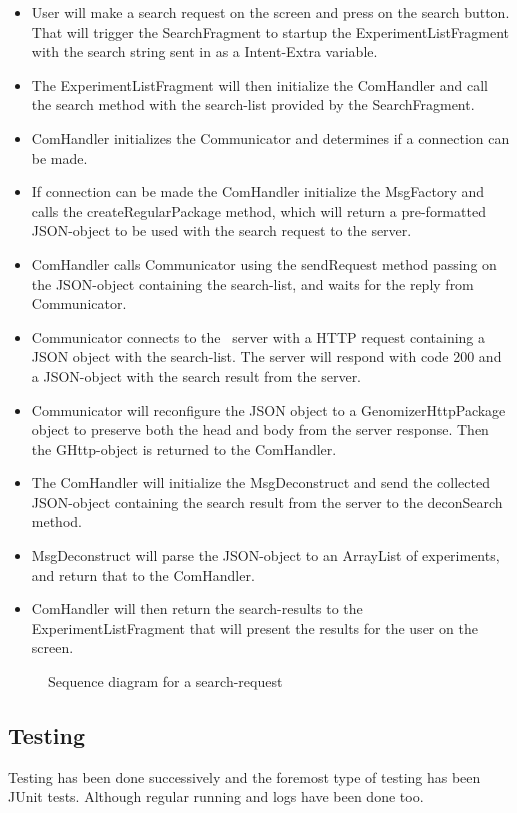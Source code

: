 	\begin{itemize}
		\item
			User will make a search request on the screen and press on the search button. That will trigger the SearchFragment to startup the ExperimentListFragment with the search string sent in as a Intent-Extra variable.
		\item
			The ExperimentListFragment will then initialize the ComHandler and call the search method with the search-list provided by the SearchFragment.
		\item
			ComHandler initializes the Communicator and determines if a connection can be made.
		\item
			If connection can be made the ComHandler initialize the MsgFactory and calls the createRegularPackage method, which will return a pre-formatted JSON-object to be used with the search request to the server.
		\item
			ComHandler calls Communicator using the sendRequest method passing on the JSON-object containing the search-list, and waits for the reply from Communicator.
		\item
			Communicator connects to the \appName\ server with a HTTP request containing a JSON object with the search-list. The server will respond with code 200 and a JSON-object with the search result from the server.
		\item
			Communicator will reconfigure the JSON object to a GenomizerHttpPackage object to preserve both the head and body from the server response. Then the GHttp-object is returned to the ComHandler.
		\item
			The ComHandler will initialize the MsgDeconstruct and send the collected JSON-object containing the search result from the server to the deconSearch method.
		\item
			MsgDeconstruct will parse the JSON-object to an ArrayList of experiments, and return that to the ComHandler.
		\item
			ComHandler will then return the search-results to the ExperimentListFragment that will present the results for the user on the screen.
	\end{itemize} 

	\begin{figure}
		\caption{Sequence diagram for a search-request}
		\label{fig:and_searchseq}
	\end{figure}
\subsection{Testing}
Testing has been done successively and the foremost type of testing has been JUnit tests. Although regular running and logs have been done too.

